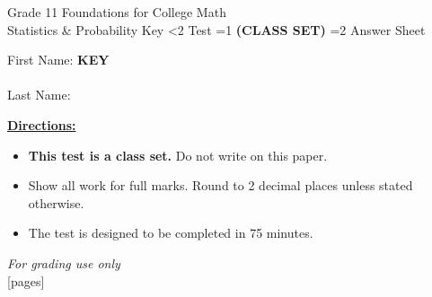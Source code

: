 \documentclass[addpoints]{exam}
\newcommand{\event}{Statistics \& Probability}
\newcommand{\tournament}{}
\def\type{0}
\begin{document}
\begin{center}
    {\huge Grade 11 Foundations for College Math \\ \event
    \ifprintanswers \space Key
    \else \space \ifnum\type<2 Test \fi \ifnum\type=1 \textbf{(CLASS SET)} \fi
          \ifnum\type=2 Answer Sheet \fi
    \fi \\ \vspace{3mm}\tournament\vspace{1mm}}
\end{center}

\vspace{.25\textheight}

\begin{center}
    First Name: \ifprintanswers
    \underline{\hspace{3.5cm}}\textbf{KEY}\underline{\hspace{5.5cm}}\\\vspace{5mm}
    \else \underline{\hspace{10cm}}\\ \vspace{5mm} \fi
    Last Name: \underline{\hspace{10cm}}\\ \vspace{5mm}
\end{center}

\noindent\textbf{\underline{Directions:}}
\begin{itemize}
    \ifnum\type=1 \item \textbf{This test is a class set.} Do not write on this paper. \fi
    \item Show all work for full marks. Round to 2 decimal places unless stated otherwise.
    \item The test is designed to be completed in 75 minutes.
\end{itemize}
\begin{center}
\textit{For grading use only}\\
[pages]
\end{center}
\end{document}
